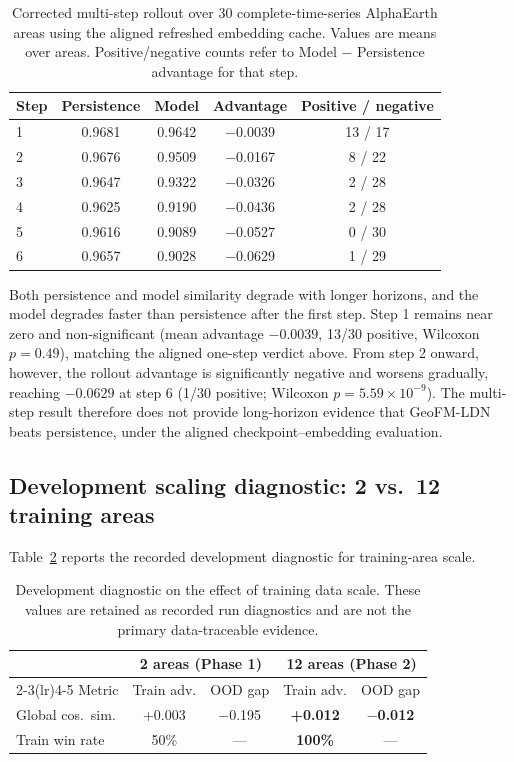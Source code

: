 \documentclass{article}
\begin{document}
\begin{table}[htbp]
\centering
\caption{Corrected multi-step rollout over 30 complete-time-series AlphaEarth areas using the aligned refreshed embedding cache. Values are means over areas. Positive/negative counts refer to Model $-$ Persistence advantage for that step.}
\label{tab:multistep}
\small
\begin{tabular}{lcccc}
\toprule
Step & Persistence & Model & Advantage & Positive / negative \\
\midrule
1 & 0.9681 & 0.9642 & $-$0.0039 & 13 / 17 \\
2 & 0.9676 & 0.9509 & $-$0.0167 & 8 / 22 \\
3 & 0.9647 & 0.9322 & $-$0.0326 & 2 / 28 \\
4 & 0.9625 & 0.9190 & $-$0.0436 & 2 / 28 \\
5 & 0.9616 & 0.9089 & $-$0.0527 & 0 / 30 \\
6 & 0.9657 & 0.9028 & $-$0.0629 & 1 / 29 \\
\bottomrule
\end{tabular}
\end{table}

Both persistence and model similarity degrade with longer horizons, and the model degrades faster than persistence after the first step. Step 1 remains near zero and non-significant (mean advantage $-0.0039$, 13/30 positive, Wilcoxon $p=0.49$), matching the aligned one-step verdict above. From step 2 onward, however, the rollout advantage is significantly negative and worsens gradually, reaching $-0.0629$ at step 6 (1/30 positive; Wilcoxon $p=5.59\times10^{-9}$). The multi-step result therefore does not provide long-horizon evidence that GeoFM-LDN beats persistence, under the aligned checkpoint--embedding evaluation.

\subsection{Development scaling diagnostic: 2 vs.~12 training areas}
\label{sec:ablation_data}

Table~\ref{tab:scaling} reports the recorded development diagnostic for training-area scale.

\begin{table}[htbp]
\centering
\caption{Development diagnostic on the effect of training data scale. These values are retained as recorded run diagnostics and are not the primary data-traceable evidence.}
\label{tab:scaling}
\begin{tabular}{lcccc}
\toprule
 & \multicolumn{2}{c}{2 areas (Phase 1)} & \multicolumn{2}{c}{12 areas (Phase 2)} \\
\cmidrule(lr){2-3}\cmidrule(lr){4-5}
Metric & Train adv. & OOD gap & Train adv. & OOD gap \\
\midrule
Global cos.~sim. & +0.003 & $-$0.195 & \textbf{+0.012} & $\mathbf{-}$\textbf{0.012} \\
Train win rate & 50\% & --- & \textbf{100\%} & --- \\
\bottomrule
\end{tabular}
\end{table}
\end{document}
